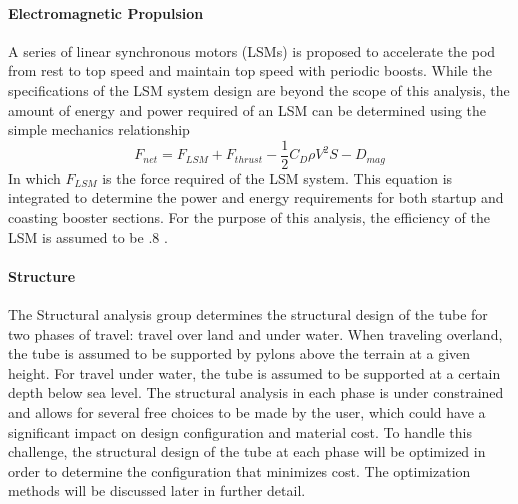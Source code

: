 \paragraph{Electromagnetic Propulsion}
	A series of linear synchronous motors (LSMs) is proposed to accelerate the pod from rest to top speed and maintain top speed with periodic boosts. While the specifications of the LSM system design are beyond the scope of this analysis, the amount of energy and power required of an LSM can be determined using the simple mechanics relationship
	\begin{equation}
		\label{eq:sum_of_forces}
		F_{net} = F_{LSM} + F_{thrust} - \frac{1}{2}C_{D}\rho V^{2}S - D_{mag}
	\end{equation}
	In which $F_{LSM}$ is the force required of the LSM system. This equation is integrated to determine the power and energy requirements for both startup and coasting booster sections. For the purpose of this analysis, the efficiency of the LSM is assumed to be .8 \cite{LSM}.
\paragraph{Structure}
	The Structural analysis group determines the structural design of the tube for two phases of travel: travel over land and under water. When traveling overland, the tube is assumed to be supported by pylons above the terrain at a given height. For travel under water, the tube is assumed to be supported at a certain depth below sea level. The structural analysis in each phase is under constrained and allows for several free choices to be made by the user, which could have a significant impact on design configuration and material cost. To handle this challenge, the structural design of the tube at each phase will be optimized in order to determine the configuration that minimizes cost. The optimization methods will be discussed later in further detail.

